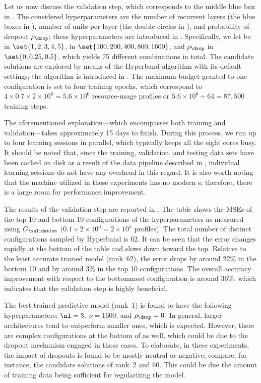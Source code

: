 Let us now discuss the validation step, which corresponds to the middle blue box
in . The considered hyperparameters are the number of
recurrent layers \nl (the blue boxes in ), number
of units per layer \nu (the double circles in ),
and probability of dropout $\rho_\drop$; these hyperparameters are introduced in
. Specifically, we let \nl be in $\set{1, 2, 3, 4,
5}$, \nu in $\set{100, 200, 400, 800, 1600}$, and $\rho_\drop$ in $\set{0, 0.25,
0.5}$, which yields 75 different combinations in total. The candidate solutions
are explored by means of the Hyperband algorithm with its default settings; the
algorithm is introduced in . The maximum budget
granted to one configuration is set to four training epochs, which correspond to
$4 \times 0.7 \times 2 \times 10^6 = 5.6 \times 10^6$ resource-usage profiles or
$5.6 \times 10^6 \div 64 = 87{,}500$ training steps.

The aforementioned exploration---which encompasses both training and
validation---takes approximately 15 days to finish. During this process, we run
up to four learning sessions in parallel, which typically keeps all the eight
cores busy. It should be noted that, since the training, validation, and testing
data sets have been cached on disk as a result of the data pipeline described in
, individual learning sessions do not have any
overhead in this regard. It is also worth noting that the machine utilized in
these experiments has no modern s; therefore, there is a large room for
performance improvement.

The results of the validation step are reported in . The
table shows the \acp{MSE} of the top 10 and bottom 10 configurations of the
hyperparameters as measured using $G_\validation$ ($0.1 \times 2 \times 10^6 = 2
\times 10^5$ profiles). The total number of distinct configurations sampled by
Hyperband is 62. It can be seen that the error changes rapidly at the bottom of
the table and slows down toward the top. Relative to the least accurate trained
model (rank~62), the error drops by around 22\% in the bottom 10 and by around
3\% in the top 10 configurations. The overall accuracy improvement with respect
to the bottommost configuration is around 36\%, which indicates that the
validation step is highly beneficial.

The best trained predictive model (rank~1) is found to have the following
hyperparameters: $\nl = 3$, $\nu = 1600$, and $\rho_\drop = 0$. In general,
larger architectures tend to outperform smaller ones, which is expected.
However, there are complex configurations at the bottom of
 as well, which could be due to the dropout mechanism
engaged in those cases. To elaborate, in these experiments, the impact of
dropouts is found to be mostly neutral or negative; compare, for instance, the
candidate solutions of rank~2 and 60. This could be due the amount of training
data being sufficient for regularizing the model.

